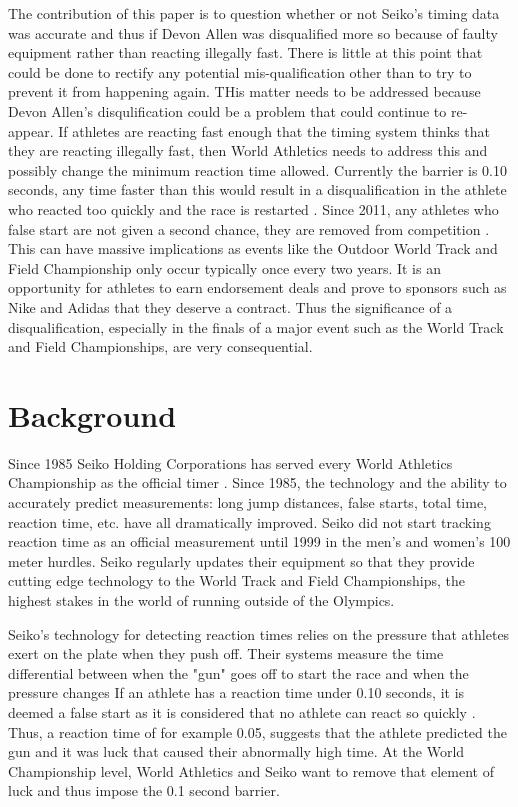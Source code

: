 \documentclass[12pt, letterpaper, titlepage]{article}
\begin{document}
The contribution of this paper is to question whether or not Seiko's timing data
was accurate and thus if Devon Allen was disqualified more so because of faulty
equipment rather than reacting illegally fast.  There is little at this point
that could be done to rectify any potential mis-qualification other than to try
to prevent it from happening again.  THis matter needs to be addressed because Devon Allen's disqulification could be a problem that could continue to re-appear.  If athletes
are reacting fast enough that the timing system thinks that they are reacting
illegally fast, then World Athletics needs to address this and possibly change
the minimum reaction time allowed.  Currently the barrier is 0.10 seconds, any time
faster than this would result in a disqualification in the athlete who reacted too
quickly and the race is restarted \citep{Seiko-Timing}.  Since 2011, any athletes who false start are not given a second chance, they are removed from competition
\citep{False-Start}.  This can have massive implications as events like the Outdoor World Track and Field Championship only occur typically once every two years.  It is an opportunity for athletes to earn endorsement deals and prove to sponsors such as Nike and Adidas that
they deserve a contract.  Thus the significance of a disqualification, especially in the finals of a major event such as the World Track and Field Championships, are very
consequential.  

\section{Background}
\label{sec:Background}
Since 1985 Seiko Holding Corporations has served every World Athletics Championship
as the official timer \citep{Seiko}.  Since 1985, the technology and the ability
to accurately predict measurements: long jump distances, false starts, total time,
reaction time, etc. have all dramatically improved.  Seiko did not start tracking
reaction time as an official measurement until 1999 in the men's and women's 100 meter
hurdles.  Seiko regularly updates their equipment so that they provide cutting edge
technology to the World Track and Field Championships, the highest stakes in the world
of running outside of the Olympics.

Seiko's technology for detecting reaction times relies on the pressure that athletes
exert on the plate when they push off.  Their systems measure the time differential
between when the "gun" goes off to start the race and when the pressure changes 
\citep{Seiko}  If an athlete has a reaction time under 0.10 seconds, it is deemed a 
false start as it is considered that no athlete can react so quickly \citep{Seiko-Timing}.  
Thus, a reaction time of for example 0.05, suggests that the athlete predicted the gun and it
was luck that caused their abnormally high time.  At the World Championship level,
World Athletics and Seiko want to remove that element of luck and thus impose the 0.1
second barrier.
\end{document}
